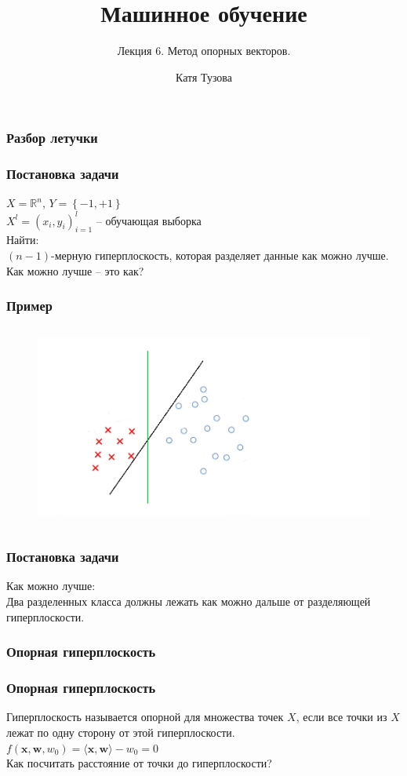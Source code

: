 \documentclass[12pt]{beamer}
\author{Катя Тузова}
\title{Машинное обучение}
\subtitle{Лекция 6. Метод опорных векторов.}
\date{}
\begin{document}
	
\frame{\titlepage}

\begin{frame}\frametitle{Разбор летучки}
\end{frame}

\begin{frame}\frametitle{Постановка задачи}
$X = \mathbb{R}^n$, ${Y = \left\{ -1, + 1\right\}}$\\
${X^l = (x_i, y_i)_{i = 1}^l}$ -- обучающая выборка\\
\vspace{5mm}Найти:\\
$(n-1)$-мерную гиперплоскость, которая разделяет данные как можно лучше.
\\ \vspace{5mm}
Как можно лучше -- это как?

\end{frame}

\begin{frame}\frametitle{Пример}
\begin{figure}[htbp]
  \includegraphics[height=190pt, keepaspectratio = true]{images/example}   
\end{figure}
\end{frame}

\begin{frame}\frametitle{Постановка задачи}
Как можно лучше:\\
Два разделенных класса должны лежать как можно дальше от разделяющей гиперплоскости.\\
\end{frame}

\begin{frame}\frametitle{Опорная гиперплоскость}
\end{frame}

\begin{frame}\frametitle{Опорная гиперплоскость}
Гиперплоскость называется опорной для множества точек
$X$, если все точки из $X$ лежат по одну сторону от этой гиперплоскости.\\\vspace{5mm}
${f(\mathbf{x},\mathbf{w}, w_0) = \langle \mathbf{x}, \mathbf{w}\rangle - w_0 = 0}$\\
\vspace{5mm}
Как посчитать расстояние от точки до гиперплоскости?
\end{frame}
\end{document}
